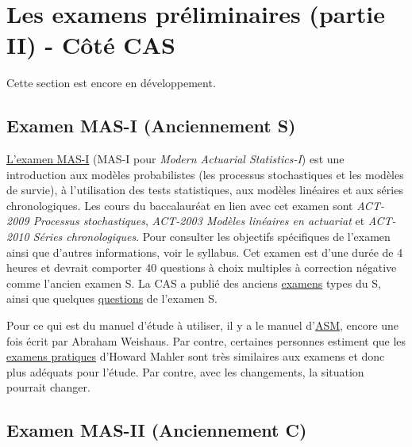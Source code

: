\newpage

\section*{Les examens préliminaires (partie II) - Côté CAS}
\label{sec:prelimssuitecas}

Cette section est encore en développement. \vspace{\baselineskip}


\subsection*{Examen MAS-I (Anciennement S)}
\label{subsec:examMAS_I}

\href{http://www.casact.org/admissions/syllabus/index.cfm?fa=MASI&parentID=391}{L'examen MAS-I} (MAS-I pour \textit{Modern Actuarial Statistics-I}) est une introduction aux modèles probabilistes (les processus stochastiques et les modèles de survie), à l'utilisation des tests statistiques, aux modèles linéaires et aux séries chronologiques. Les cours du baccalauréat en lien avec cet examen sont \textit{ACT-2009 Processus stochastiques}, \textit{ACT-2003 Modèles linéaires en actuariat} et \textit{ACT-2010 Séries chronologiques}. Pour consulter les objectifs spécifiques de l'examen ainsi que d'autres informations, voir le syllabus. Cet examen est d'une durée de 4 heures et devrait comporter 40 questions à choix multiples à correction négative comme l'ancien examen S. La CAS a publié des anciens \href{http://www.casact.org/admissions/studytools/examS/}{examens} types du S, ainsi que quelques \href{http://www.casact.org/admissions/studytools/examS/Sample_Questions.pdf}{questions} de l'examen S.\vspace{\baselineskip}

Pour ce qui est du manuel d'étude à utiliser, il y a le manuel d'\href{https://drive.google.com/open?id=0B6kXivc6X9LISGhkVUkzLW5sSnc}{ASM}, encore une fois écrit par Abraham Weishaus. Par contre, certaines personnes estiment que les \href{https://drive.google.com/open?id=0B6kXivc6X9LIOUs3SDF3NmVKNGM}{examens pratiques} d'Howard Mahler sont très similaires aux examens et donc plus adéquats pour l'étude. Par contre, avec les changements, la situation pourrait changer. \vspace{\baselineskip}


\subsection*{Examen MAS-II (Anciennement C)}
\label{subsec:examMAS_II}

